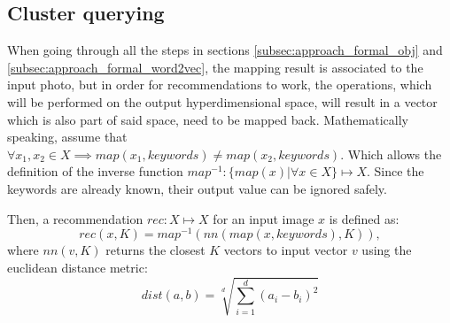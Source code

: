 \subsection{Cluster querying}
\label{subsec:approach_formal_cluster}

When going through all the steps in sections \ref{subsec:approach_formal_obj} and \ref{subsec:approach_formal_word2vec}, the mapping result is associated to the input photo, but in order for recommendations to work, the operations, which will be performed on the output hyperdimensional space, will result in a vector which is also part of said space, need to be mapped back. Mathematically speaking, assume that $\forall x_1, x_2 \in X \implies map(x_1, keywords) \neq map(x_2, keywords)$. Which allows the definition of the inverse function $map^{-1} : \{ map(x) | \forall x \in X \} \mapsto X$. Since the keywords are already known, their output value can be ignored safely.

Then, a recommendation $rec: X \mapsto X$ for an input image $x$ is defined as:
$$rec(x, K) = map^{-1}(nn(map(x, keywords), K)),$$
where $nn(v, K)$ returns the closest $K$ vectors to input vector $v$ using the euclidean distance metric:
$$ dist(a, b) = \sqrt[d]{\sum_{i=1}^{d}{(a_i - b_i)^2}} $$
